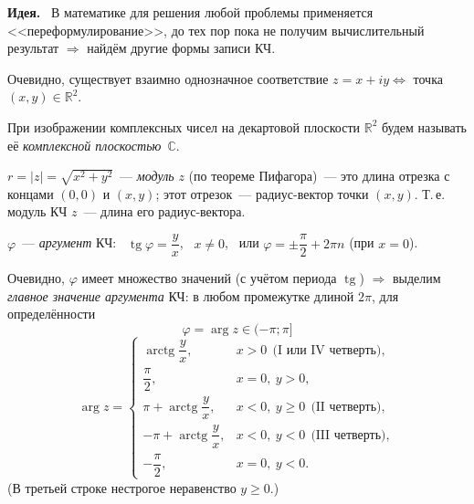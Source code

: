 \documentclass[a4paper,11pt]{article}
\newcommand{\lead}[1]{\textbf{\color{leadcol}#1}\ }
\newcommand{\rtg}{\operatorname{tg}}
\newcommand{\rarctg}{\operatorname{arctg}}
\newcommand{\Rez}{\operatorname{Re}}
\newcommand{\Imz}{\operatorname{Im}}
\begin{document}
\lead{Идея.} В математике для решения любой проблемы применяется <<переформулирование>>, до тех
пор пока не получим вычислительный результат $\Rightarrow$ найдём другие формы записи КЧ.

Очевидно, существует взаимно однозначное соответствие $z=x+iy\iff$ точка $(x,y)\in\mathbb R^2$.
\begin{center}
\end{center}
При изображении комплексных чисел на декартовой плоскости $\mathbb R^2$ будем называть её
\emph{комплексной плоскостью}~$\mathbb C$.

$r=|z|=\sqrt{x^2+y^2}$~--- \emph{модуль} $z$ (по теореме Пифагора)~--- это длина отрезка с концами
$(0,0)$ и $(x,y)$; этот отрезок~--- радиус-вектор точки $(x,y)$. Т.\,е. модуль КЧ $z$~--- длина его
радиус-вектора.

$\varphi$~--- \emph{аргумент} КЧ: \ $\rtg\varphi=\dfrac yx$, \ $x\ne0$, \ или $\varphi=\pm\dfrac\pi2+2\pi n$
(при $x=0$).

Очевидно, $\varphi$ имеет множество значений (с учётом периода $\rtg$) $\Rightarrow$ выделим
\emph{главное значение аргумента} КЧ: в любом промежутке длиной $2\pi$, для определённости
\[
\boxed{\ \varphi=\arg z\in(-\pi;\pi]\ }
\]
\[
\arg z=\begin{cases}
\rarctg\dfrac yx, & x>0\ \ \text{(I или IV четверть)},\\[6pt]
\dfrac\pi2, & x=0,\ y>0,\\[6pt]
\pi+\rarctg\dfrac yx, & x<0,\ y\geqslant0\ \ \text{(II четверть)},\\[6pt]
-\pi+\rarctg\dfrac yx, & x<0,\ y<0\ \ \text{(III четверть)},\\[6pt]
-\dfrac\pi2, & x=0,\ y<0.
\end{cases}
\]
\vspace{-2pt}(В третьей строке нестрогое неравенство $y\geqslant0$.)
\end{document}
